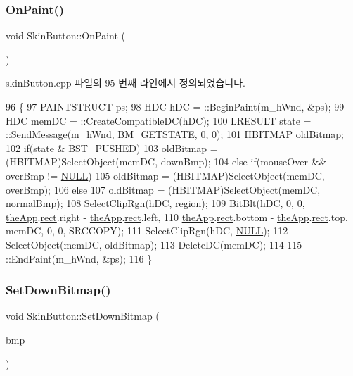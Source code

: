 \subsubsection{\texorpdfstring{On\+Paint()}{OnPaint()}}
{\footnotesize\ttfamily void Skin\+Button\+::\+On\+Paint (\begin{DoxyParamCaption}{ }\end{DoxyParamCaption})\hspace{0.3cm}{\ttfamily [protected]}}



skin\+Button.\+cpp 파일의 95 번째 라인에서 정의되었습니다.


\begin{DoxyCode}
96 \{
97   PAINTSTRUCT ps;
98   HDC hDC = ::BeginPaint(m\_hWnd, &ps);
99   HDC memDC = ::CreateCompatibleDC(hDC);
100   LRESULT state = ::SendMessage(m\_hWnd, BM\_GETSTATE, 0, 0);
101   HBITMAP oldBitmap;
102   \textcolor{keywordflow}{if}(state & BST\_PUSHED)
103     oldBitmap = (HBITMAP)SelectObject(memDC, downBmp);
104   \textcolor{keywordflow}{else} \textcolor{keywordflow}{if}(mouseOver && overBmp != \mbox{\hyperlink{getopt1_8c_a070d2ce7b6bb7e5c05602aa8c308d0c4}{NULL}})
105     oldBitmap = (HBITMAP)SelectObject(memDC, overBmp);
106   \textcolor{keywordflow}{else}
107     oldBitmap = (HBITMAP)SelectObject(memDC, normalBmp);
108   SelectClipRgn(hDC, region);
109   BitBlt(hDC, 0, 0, \mbox{\hyperlink{_v_b_a_8cpp_a8095a9d06b37a7efe3723f3218ad8fb3}{theApp}}.\mbox{\hyperlink{class_v_b_a_a1303c6cf4f955c31d828de3fe77355f1}{rect}}.right - \mbox{\hyperlink{_v_b_a_8cpp_a8095a9d06b37a7efe3723f3218ad8fb3}{theApp}}.\mbox{\hyperlink{class_v_b_a_a1303c6cf4f955c31d828de3fe77355f1}{rect}}.left,
110          \mbox{\hyperlink{_v_b_a_8cpp_a8095a9d06b37a7efe3723f3218ad8fb3}{theApp}}.\mbox{\hyperlink{class_v_b_a_a1303c6cf4f955c31d828de3fe77355f1}{rect}}.bottom - \mbox{\hyperlink{_v_b_a_8cpp_a8095a9d06b37a7efe3723f3218ad8fb3}{theApp}}.\mbox{\hyperlink{class_v_b_a_a1303c6cf4f955c31d828de3fe77355f1}{rect}}.top, memDC, 0, 0, SRCCOPY);
111   SelectClipRgn(hDC, \mbox{\hyperlink{getopt1_8c_a070d2ce7b6bb7e5c05602aa8c308d0c4}{NULL}});
112   SelectObject(memDC, oldBitmap);
113   DeleteDC(memDC);
114 
115   ::EndPaint(m\_hWnd, &ps);
116 \}
\end{DoxyCode}
\mbox{\label{class_skin_button_a42845ac49a2d37651369d40a81656c4b}} 
\subsubsection{\texorpdfstring{Set\+Down\+Bitmap()}{SetDownBitmap()}}
{\footnotesize\ttfamily void Skin\+Button\+::\+Set\+Down\+Bitmap (\begin{DoxyParamCaption}\item[{H\+B\+I\+T\+M\+AP}]{bmp }\end{DoxyParamCaption})}



